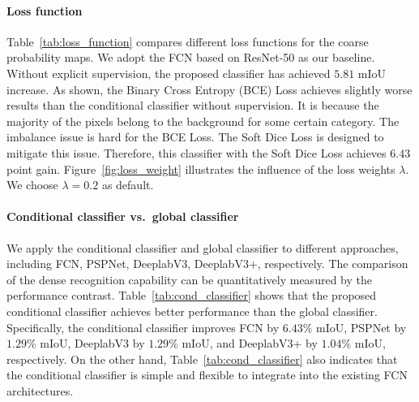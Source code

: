 \documentclass[journal]{IEEEtran}
\def\vs{vs.~}
\begin{document}
\paragraph{Loss function}
Table~\ref{tab:loss_function} compares different loss functions
for the coarse probability maps.
We adopt the FCN based on ResNet-50 as our baseline.
Without explicit supervision,
the proposed classifier has achieved
$5.81$ mIoU increase.
As shown, the Binary Cross Entropy (BCE) Loss
achieves slightly worse results 
than the conditional classifier without supervision.
It is because
the majority of the pixels belong to the background for some certain category.
The imbalance issue is hard for the BCE Loss.
The Soft Dice Loss is designed to 
mitigate this issue.
Therefore,
this classifier with the Soft Dice Loss 
achieves
$6.43$ point gain.
Figure~\ref{fig:loss_weight}
illustrates the influence of the loss weights $\lambda$.
We choose $\lambda=0.2$ as default.


\paragraph{Conditional classifier \vs global classifier}
We apply the conditional classifier and global classifier
to different approaches,
including FCN, PSPNet, DeeplabV3, DeeplabV3+,
respectively.
The comparison of the dense recognition capability 
can be quantitatively measured by the performance contrast.
Table~\ref{tab:cond_classifier}
shows that the proposed conditional classifier
achieves better performance than the global classifier.
Specifically,
the conditional classifier improves 
FCN by $6.43\%$ mIoU,
PSPNet by $1.29\%$ mIoU,
DeeplabV3 by $1.29\%$ mIoU,
and DeeplabV3+ by $1.04\%$ mIoU,
respectively.
On the other hand,
Table~\ref{tab:cond_classifier}
also indicates
that the conditional classifier
is simple and flexible to 
integrate into the existing FCN architectures.
\end{document}
